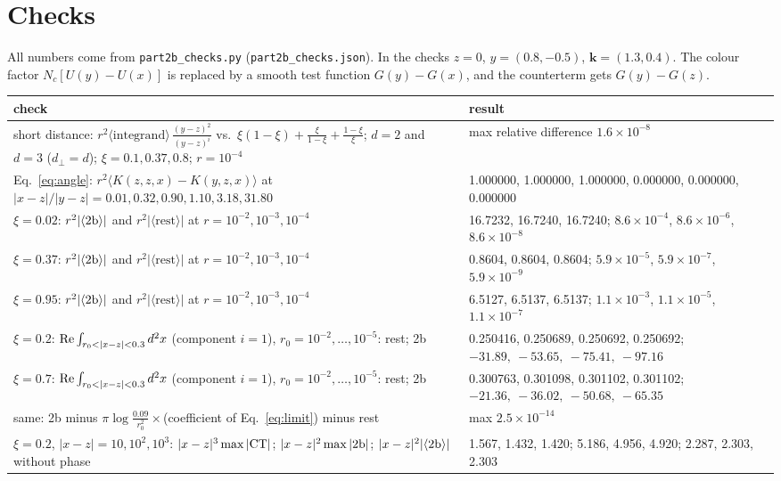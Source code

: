 \documentclass[10pt]{article}
\numberwithin{equation}{section}
\begin{document}
\section{Checks}\label{sec:checks}
All numbers come from \texttt{part2b\_checks.py} (\texttt{part2b\_checks.json}). In the checks $z=0$, $y=(0.8,-0.5)$, $\mathbf k=(1.3,0.4)$. The colour factor $N_c[U(y)-U(x)]$ is replaced by a smooth test function $G(y)-G(x)$, and the counterterm gets $G(y)-G(z)$.
\begin{table}[H]
\centering\small
\begin{tabular}{@{}p{} p{}@{}}
check & result\\ \hline
short distance: $r^2\langle\text{integrand}\rangle\,\frac{(y-z)^2}{(y-z)^i}$ vs.\ $\xi(1-\xi)+\frac{\xi}{1-\xi}+\frac{1-\xi}{\xi}$; $d=2$ and $d=3$ ($d_\perp=d$); $\xi=0.1,0.37,0.8$; $r=10^{-4}$ & max relative difference $1.6\times10^{-8}$\\
Eq.~\eqref{eq:angle}: $r^2\langle K(z,z,x)-K(y,z,x)\rangle$ at $|x-z|/|y-z|=0.01, 0.32, 0.90, 1.10, 3.18, 31.80$ & 1.000000, 1.000000, 1.000000, 0.000000, 0.000000, 0.000000\\
$\xi=0.02$: $r^2|\langle{\rm 2b}\rangle|$ and $r^2|\langle\text{rest}\rangle|$ at $r=10^{-2},10^{-3},10^{-4}$ & 16.7232, 16.7240, 16.7240; $8.6\times10^{-4}$, $8.6\times10^{-6}$, $8.6\times10^{-8}$\\
$\xi=0.37$: $r^2|\langle{\rm 2b}\rangle|$ and $r^2|\langle\text{rest}\rangle|$ at $r=10^{-2},10^{-3},10^{-4}$ & 0.8604, 0.8604, 0.8604; $5.9\times10^{-5}$, $5.9\times10^{-7}$, $5.9\times10^{-9}$\\
$\xi=0.95$: $r^2|\langle{\rm 2b}\rangle|$ and $r^2|\langle\text{rest}\rangle|$ at $r=10^{-2},10^{-3},10^{-4}$ & 6.5127, 6.5137, 6.5137; $1.1\times10^{-3}$, $1.1\times10^{-5}$, $1.1\times10^{-7}$\\
$\xi=0.2$: ${\rm Re}\int_{r_0<|x-z|<0.3}d^2x$ (component $i=1$), $r_0=10^{-2},\dots,10^{-5}$: rest; 2b & 0.250416, 0.250689, 0.250692, 0.250692; $-31.89,\ -53.65,\ -75.41,\ -97.16$\\
$\xi=0.7$: ${\rm Re}\int_{r_0<|x-z|<0.3}d^2x$ (component $i=1$), $r_0=10^{-2},\dots,10^{-5}$: rest; 2b & 0.300763, 0.301098, 0.301102, 0.301102; $-21.36,\ -36.02,\ -50.68,\ -65.35$\\
same: 2b minus $\pi\log\frac{0.09}{r_0^2}\times$(coefficient of Eq.~\eqref{eq:limit}) minus rest & max $2.5\times10^{-14}$\\
$\xi=0.2$, $|x-z|=10,10^2,10^3$: $|x-z|^3\max|{\rm CT}|$; $|x-z|^2\max|{\rm 2b}|$; $|x-z|^2|\langle{\rm 2b}\rangle|$ without phase & 1.567, 1.432, 1.420; 5.186, 4.956, 4.920; 2.287, 2.303, 2.303\\

\end{tabular}
\end{table}
\end{document}
